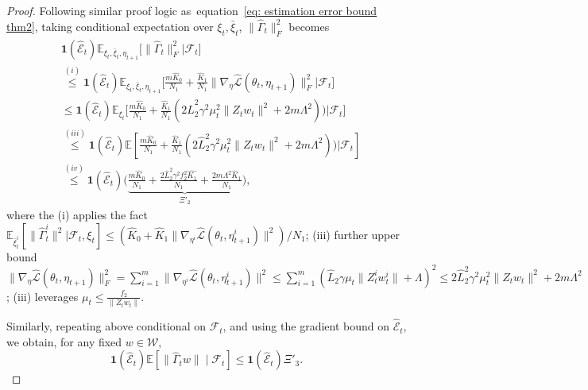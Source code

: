 \documentclass[twoside]{article} %
\def\eqref#1{equation~\ref{#1}}
\theoremstyle{plain}
\theoremstyle{definition}
\theoremstyle{remark}
\newcommand{\HGamma}{\hat{\Gamma}}
\newcommand{\hL}{\hat{L}}
\newcommand{\fhL}{\hat{\mathcal{L}}}
\newcommand{\calhatE}{\mathcal{\hat{E}}}
\begin{document}
\begin{proof}
Following similar proof logic as~\eqref{eq: estimation error bound thm2},  taking conditional expectation over ${\xi}_t,\bar{\xi}_t$, $ \|\hat{\Gamma}_{t}\|_F^2$ becomes
\begin{align}
    &\mathbf{1}(\calhatE_t)\mathbb{E}_{{\xi}_t,\bar{\xi}_t,\eta_{t+1}}\Big[  \|\hat{\Gamma}_{t}\|_F^2|\mathcal{F}_t\Big]\nonumber\\
    &\overset{(i)}{\leq} \mathbf{1}(\calhatE_t)\mathbb{E}_{{\xi}_t,\bar{\xi}_t,\eta_{t+1}}\Big[\frac{m\hat{K}_0}{N_1}+\frac{\hat{K}_1}{N_1}\|\nabla_{\eta}\fhL(\theta_t, \eta_{t+1})\|_F^2|\mathcal{F}_t\Big]\nonumber\\
    &\overset{}{\leq} \mathbf{1}(\calhatE_t) \mathbb{E}_{{\xi}_t}\Big[ \frac{m\hat{K}_0}{N_1}+\frac{\hat{K}_1}{N_1}(2\hL_2^2\gamma^2\mu_t^2\|Z_tw_t\|^2+2m\Lambda^2))|\mathcal{F}_t\Big]\nonumber\\
    &\overset{(iii)}{\leq} \mathbf{1}(\calhatE_t) \mathbb{E}[
    \frac{m\hat{K}_0}{N_1}+\frac{\hat{K}_1}{N_1}(2\hL_2^2\gamma^2\mu_t^2\|Z_tw_t\|^2+2m\Lambda^2))|\mathcal{F}_t]\nonumber\\
    &\overset{(iv)}{\leq}  \mathbf{1}(\calhatE_t)\big(\underbrace{\frac{m\hat{K}_0}{N_1}+\frac{2\hL_2^2\gamma^2f_2^2\hat{K_1}}{N_1}+\frac{2m\Lambda^2\hat{K}_1}{N_1}}_{\Xi'_2}\big),
    \label{eq: variance intermediate bound alg3}
\end{align}
where the (i) applies the fact $\mathbb{E}_{\bar{\xi}_t^i}[\|\HGamma_{t}^i\|^2|\mathcal{F}_t,\xi_t]\leq (\hat{K}_0+\hat{K}_1\|\nabla_{\eta^i}\fhL(\theta_t,\eta^i_{t+1})\|^2)/N_1$; (iii) further upper bound $\|\nabla_{\eta}\fhL(\theta_t, \eta_{t+1})\|^2_F=\sum_{i=1}^{m}\|\nabla_{\eta^i}\fhL(\theta_t, \eta_{t+1}^i)\|^2\leq \sum_{i=1}^{m}(\hL_2\gamma\mu_t \|Z_t^iw_t^i\|+\Lambda)^2\leq 2\hL_2^2\gamma^2\mu_t^2\|Z_tw_t\|^2+2m\Lambda^2$; (iii) leverages $\mu_t\leq \frac{f_2}{\|Z_tw_t\|}$. 

Similarly, repeating above conditional on $\mathcal F_t$, and using the gradient bound on $\calhatE_t$, we obtain, for any fixed \(w\in\mathcal W\),
$$
\mathbf1({\calhatE_t})
\mathbb E[\|\widehat\Gamma_t w\|\mid\mathcal F_t]
\le \mathbf1({\widehat{\mathcal E}_t})\Xi'_3.
$$


\end{proof}
\end{document}
